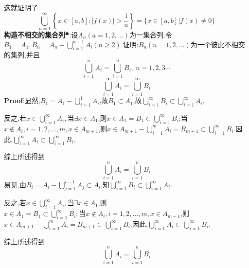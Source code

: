 这就证明了
$$
\bigcup_{n=1}^{\infty}\left\{x\in[a,b] : |f(x)|>\frac{1}{n}\right\}=\{x\in[a,b]|f(x)\neq 0\}
$$
\qquad \textbf{构造不相交的集合列}$^\spadesuit $:设$A_n(a=1,2,...)$为一集合列.令$B_1=A_1,B_n=A_n-\bigcup_{i=1}^{n-1}A_i(n\geqslant 2)$.证明:$B_n(n=1,2,...)$为一个彼此不相交的集列,并且
$$
\bigcup_{i=1}^n A_i=\bigcup_{i=1}^n B_i,\ n=1,2,3\cdots
$$
$$
\bigcup_{i=1}^\infty A_i=\bigcup_{i=1}^\infty B_i
$$
\qquad \textbf{Proof}:显然,$B_1=A_1-\bigcup_{i=1}^{1}A_i$,故$B_1⊂A_1$,故$\bigcup_{i=1}^\infty B_i⊂\bigcup_{i=1}^\infty A_i$.\par
反之,若$x\in\bigcup_{i=1}^\infty A_i,\text{当}\exists x\in A_1$,则$x\in A_1=B_1\subset\bigcup_{i=1}^\infty B_i$;当$x\notin A_i,i=1,2,...,m,x\in A_{m+1}$,则$x\in A_{m+1}-\bigcup_{i=1}^mA_i=B_{m+1}\subset\bigcup_{i=1}^\infty B_i$.因此,$\bigcup_{i=1}^\infty A_i\subset\bigcup_{i=1}^\infty B_i$.\par
综上所述得到
$$
\bigcup_{i=1}^n A_i=\bigcup_{i=1}^n B_i
$$
易见,由$B_i=A_i-\bigcup_{j=1}^{i-1}A_j\subset A_i$,知$\bigcup_{i=1}^\infty B_i\subset\bigcup_{i=1}^\infty A_i$.\par
反之,若$x\in\bigcup_{i=1}^\infty A_i,\text{当}\exists x\in A_1$,则$x\in A_1=B_1\subset\bigcup_{i=1}^\infty B_i;\text{当}x\notin A_i,i=1,2,...,m,x\in A_{m+1}$,则$x\in A_{m+1}-\bigcup_{i=1}^mA_i=B_{m+1}\subset\bigcup_{i=1}^\infty B_i$.因此,$\bigcup_{i=1}^\infty A_i\subset\bigcup_{i=1}^\infty B_i$.\par
综上所述得到
$$
\bigcup_{i=1}^n A_i=\bigcup_{i=1}^n B_i
$$